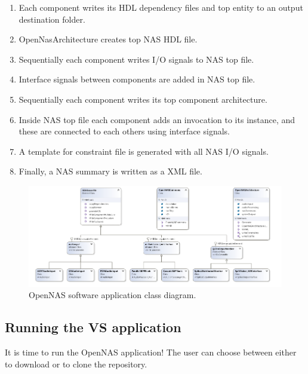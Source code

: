 \begin{enumerate}  
\item Each component writes its HDL dependency files and top entity to an output destination folder.
\item OpenNasArchitecture creates top NAS HDL file.
\item Sequentially each component writes I/O signals to NAS top file.
\item Interface signals between components are added in NAS top file.
\item Sequentially each component writes its top component architecture.
\item Inside NAS top file each component adds an invocation to its instance, and these are connected to each others using interface signals.
\item A template for constraint file is generated with all NAS I/O signals.
\item Finally, a NAS summary is written as a XML file.
\end{enumerate}

\begin{figure}[H]
\centering
\includegraphics[width=1\textwidth]{OpenNASClassDiagram.PNG}
\caption{\label{fig:OpenNAS_ClassDiagram}OpenNAS software application class diagram.}
\end{figure}


\subsection{Running the VS application}

It is time to run the OpenNAS application! The user can choose between either to download or to clone the repository. 

